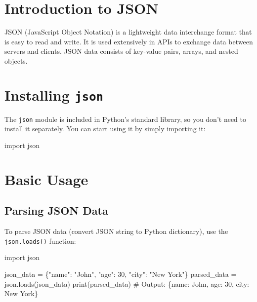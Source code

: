 \documentclass[
  letterpaper,
  DIV=11,
  numbers=noendperiod]{scrreprt}
\newenvironment{Shaded}{\begin{snugshade}}{\end{snugshade}}
\newcommand{\BuiltInTok}[1]{\textcolor[rgb]{0.00,0.23,0.31}{#1}}
\newcommand{\CommentTok}[1]{\textcolor[rgb]{0.37,0.37,0.37}{#1}}
\newcommand{\ImportTok}[1]{\textcolor[rgb]{0.00,0.46,0.62}{#1}}
\newcommand{\NormalTok}[1]{\textcolor[rgb]{0.00,0.23,0.31}{#1}}
\newcommand{\OperatorTok}[1]{\textcolor[rgb]{0.37,0.37,0.37}{#1}}
\newcommand{\StringTok}[1]{\textcolor[rgb]{0.13,0.47,0.30}{#1}}
\begin{document}
\section{Introduction to JSON}\label{introduction-to-json}

JSON (JavaScript Object Notation) is a lightweight data interchange
format that is easy to read and write. It is used extensively in APIs to
exchange data between servers and clients. JSON data consists of
key-value pairs, arrays, and nested objects.

\section{\texorpdfstring{Installing
\texttt{json}}{Installing json}}\label{installing-json}

The \texttt{json} module is included in Python's standard library, so
you don't need to install it separately. You can start using it by
simply importing it:

\begin{Shaded}
\begin{Highlighting}[]
\ImportTok{import}\NormalTok{ json}
\end{Highlighting}
\end{Shaded}

\section{Basic Usage}\label{basic-usage-1}

\subsection{Parsing JSON Data}\label{parsing-json-data}

To parse JSON data (convert JSON string to Python dictionary), use the
\texttt{json.loads()} function:

\begin{Shaded}
\begin{Highlighting}[]
\ImportTok{import}\NormalTok{ json}

\NormalTok{json\_data }\OperatorTok{=} \StringTok{\textquotesingle{}\{"name": "John", "age": 30, "city": "New York"\}\textquotesingle{}}
\NormalTok{parsed\_data }\OperatorTok{=}\NormalTok{ json.loads(json\_data)}
\BuiltInTok{print}\NormalTok{(parsed\_data)  }\CommentTok{\# Output: \{\textquotesingle{}name\textquotesingle{}: \textquotesingle{}John\textquotesingle{}, \textquotesingle{}age\textquotesingle{}: 30, \textquotesingle{}city\textquotesingle{}: \textquotesingle{}New York\textquotesingle{}\}}
\end{Highlighting}
\end{Shaded}
\end{document}
